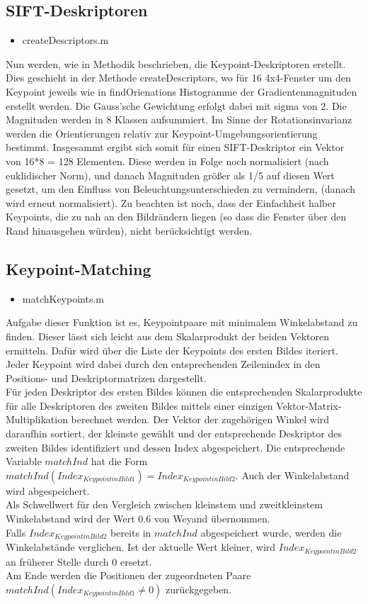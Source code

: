 \documentclass[deutsch]{scrartcl}
\begin{document}
\subsection{SIFT-Deskriptoren}
\begin{itemize}
	\item createDescriptors.m 
\end{itemize}
Nun werden, wie in Methodik beschrieben, die Keypoint-Deskriptoren erstellt. Dies geschieht in der Methode createDescriptors, wo für 16 4x4-Fenster um den Keypoint jeweils wie in findOrienations Histogramme der Gradientenmagnituden erstellt werden. Die Gauss'sche Gewichtung erfolgt dabei mit sigma von 2. Die Magnituden werden in 8 Klassen aufsummiert. Im Sinne der Rotationsinvarianz werden die Orientierungen relativ zur Keypoint-Umgebungsorientierung bestimmt. Insgesammt ergibt sich somit für einen SIFT-Deskriptor ein Vektor von 16*8 = 128 Elementen. Diese werden in Folge noch normalisiert (nach euklidischer Norm), und danach Magnituden größer als 1/5 auf diesen Wert gesetzt, um den Einfluss von Beleuchtungsunterschieden zu vermindern, (danach wird erneut normalisiert). Zu beachten ist noch, dass der Einfachheit halber Keypoints, die zu nah an den Bildrändern liegen (so dass die Fenster über den Rand hinausgehen würden), nicht berücksichtigt werden.

\subsection{Keypoint-Matching}
\begin{itemize}
	\item matchKeypoints.m
\end{itemize}
Aufgabe dieser Funktion ist es, Keypointpaare mit minimalem Winkelabstand zu finden. Dieser lässt sich leicht aus dem Skalarprodukt der beiden Vektoren ermitteln. Dafür wird über die Liste der Keypoints des ersten Bildes iteriert. Jeder Keypoint wird dabei durch den entsprechenden Zeilenindex in den Positions- und Deskriptormatrizen dargestellt. \\ 
Für jeden Deskriptor des ersten Bildes können die entsprechenden Skalarprodukte für alle Deskriptoren des zweiten Bildes mittels einer einzigen Vektor-Matrix-Multiplikation berechnet werden. Der Vektor der zugehörigen Winkel wird daraufhin sortiert, der kleinste gewählt und der entsprechende Deskriptor des zweiten Bildes identifiziert und dessen Index abgespeichert. Die entsprechende Variable $matchInd$ hat die Form $matchInd( Index_{Keypoint in Bild1} ) = Index_{Keypoint in Bild 2}$. Auch der Winkelabstand wird abgespeichert. \\
Als Schwellwert für den Vergleich zwischen kleinstem und zweitkleinstem Winkelabstand wird der Wert 0.6 von Weyand\cite{pandemo} übernommen. \\
Falls $Index_{Keypoint in Bild 2}$ bereits in $matchInd$ abgespeichert wurde, werden die Winkelabstände verglichen. Ist der aktuelle Wert kleiner, wird $Index_{Keypoint in Bild 2}$ an früherer Stelle durch 0 ersetzt. \\
Am Ende werden die Positionen der zugeordneten Paare\\$matchInd(Index_{Keypoint in Bild1} \neq 0)$  zurückgegeben.
\end{document}
